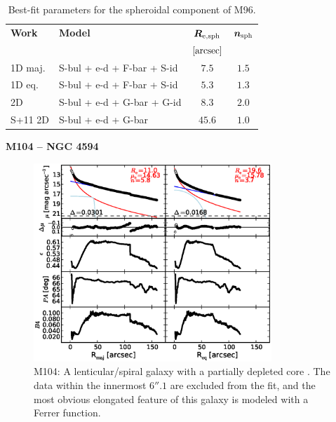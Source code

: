 \documentclass[preprint2]{emulateapj}
\newcommand{\fitfigurewidth}{0.8\textwidth}
\begin{document}
  \begin{table}[h]
  \small
  \caption{Best-fit parameters for the spheroidal component of M96.}
  \begin{center}
  \begin{tabular}{llcc}
  \hline
  {\bf Work} & {\bf Model}   & $\bm R_{\rm e,sph}$    & $\bm n_{\rm sph}$ \\
    &  &  $[\rm arcsec]$ & \\
  \hline
  1D maj. & S-bul + e-d + F-bar + S-id  & $7.5$  &  $1.5$ \\
  1D eq.  & S-bul + e-d + F-bar + S-id  & $5.3$  &  $1.3$ \\
  2D      & S-bul + e-d + G-bar + G-id  & $8.3$  &  $2.0$ \\
  \hline
  S+11 2D         & S-bul + e-d + G-bar  & $45.6$  &  $1.0$ \\
  \hline
  \end{tabular}
  \end{center}
  \label{tab:m96}
  \end{table}


  \clearpage\newpage\noindent

  {\bf M104 -- NGC 4594 \\} 

  \begin{figure}[h]
  \begin{center}
  \includegraphics[width=\fitfigurewidth]{m104_1Dfit.eps}
  \caption{M104: 
  A lenticular/spiral galaxy with a partially depleted core \citep{jardel2011}. 
  The data within the innermost $6''.1$ are excluded from the fit, 
  and the most obvious elongated feature of this galaxy is modeled with a Ferrer function.
  }
  \end{center}
  \end{figure}
  
\end{document}
